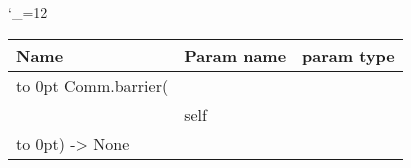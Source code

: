 \begingroup \catcode`\_=12 \tt
\begin{tabular}{lll}
\toprule
\textrm{Name}&\textrm{Param name}&\textrm{param type}\\
\midrule
\hbox to 0pt {Comm.barrier(\hss}\\
& self\\
\hbox to 0pt{) -> None\hss}\\
\bottomrule
\end{tabular}
\endgroup

